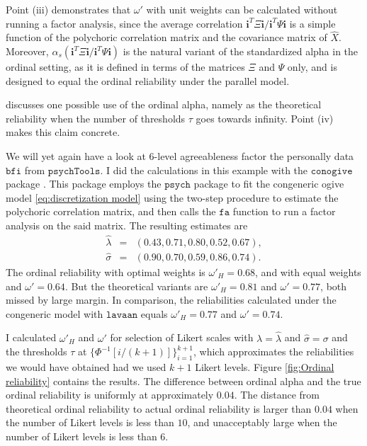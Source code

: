 \documentclass[twoside]{article}
\begin{document}
Point (iii) demonstrates that $\omega'$ with unit weights can be
calculated without running a factor analysis, since the average correlation
$\mathbf{i}^{T}\Xi\mathbf{i}/\mathbf{i}^{T}\Psi\mathbf{i}$ is a simple
function of the polychoric correlation matrix and the covariance matrix
of $\hat{X}.$ Moreover, $\alpha_{s}(\mathbf{i}^{T}\Xi\mathbf{i}/\mathbf{i}^{T}\Psi\mathbf{i})$
is the natural variant of the standardized alpha in the ordinal setting,
as it is defined in terms of the matrices $\Xi$ and $\Psi$ only,
and is designed to equal the ordinal reliability under the parallel
model. 

\citet[p. 1068]{Chalmers2018-fj} discusses one possible use of the
ordinal alpha, namely as the theoretical reliability when the number
of thresholds $\tau$ goes towards infinity. Point (iv) makes this
claim concrete.

\begin{example}
We will yet again have a look at $6$-level agreeableness factor the
personally data $\mathtt{bfi}$ from $\mathtt{psychTools}$. I did the calculations in this example with the $\mathtt{conogive}$ package \citep{conogive}. This package employs the $\mathtt{psych}$ \citep{psych} package to fit the congeneric ogive
model \eqref{eq:discretization model} using the two-step procedure
to estimate the polychoric correlation matrix, and then calls the $\mathtt{fa}$ function to run a factor analysis on the said matrix.
The resulting estimates are 
\begin{eqnarray*}
\hat{\lambda} & = & (0.43,0.71,0.80,0.52,0.67),\\
\hat{\sigma} & = & (0.90,0.70,0.59,0.86,0.74).
\end{eqnarray*} The ordinal reliability
with optimal weights is $\omega'_{H}=0.68$, and with equal weights
and $\omega'=0.64$. But the theoretical variants are $\omega'_{H}=0.81$
and $\omega'=0.77$, both missed by large margin. In comparison, the
reliabilities calculated under the congeneric model with $\mathtt{lavaan}$ \citep{Rosseel2012-yg}
equals $\omega'_{H}=0.77$ and $\omega'=0.74$.

I calculated $\omega'_{H}$ and $\omega'$ for selection of Likert
scales with $\lambda=\hat{\lambda}$ and $\hat{\sigma}=\sigma$ and
the thresholds $\tau$ at $\{\Phi^{-1}[i/(k+1)]\}_{i=1}^{k+1}$, which
approximates the reliabilities we would have obtained had we used
$k+1$ Likert levels. Figure \ref{fig:Ordinal reliability} contains the results. The difference between ordinal alpha and the true ordinal reliability is uniformly at approximately $0.04$. The distance from theoretical ordinal reliability to actual ordinal reliability is larger than $0.04$ when the number of Likert levels is less than $10$, and unacceptably large when the number of Likert levels is less than $6$. 
\end{example}
\end{document}
